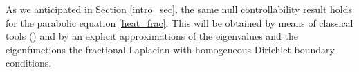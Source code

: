 As we anticipated in Section \ref{intro_sec}, the same null controllability result holds for the parabolic equation \eqref{heat_frac}. This will be obtained by means of classical tools (\cite{fattorini1971exact}) and by an explicit approximations of the eigenvalues and the eigenfunctions the fractional Laplacian with homogeneous Dirichlet boundary conditions. 

